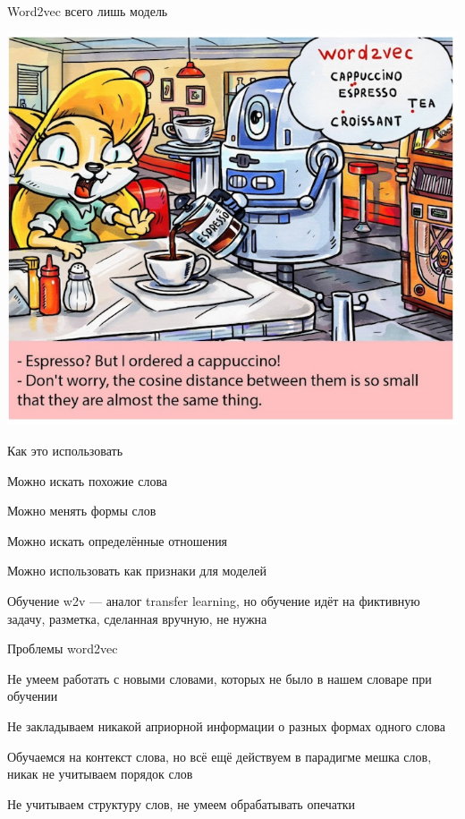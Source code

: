 \documentclass[notes,12pt, aspectratio=169]{beamer}
\newenvironment{wideitemize}{\itemize\addtolength{\itemsep}{10pt}}{\enditemize}
\begin{document}
\begin{frame}{Word2vec всего лишь модель}
	\begin{center}
		\includegraphics[width=.55\linewidth]{w2v_idiot.jpg}
	\end{center}
\end{frame} 


\begin{frame}{Как это использовать}
	\begin{wideitemize} 
		\item Можно искать похожие слова
		
		\item  Можно менять формы слов
		
		\item  Можно искать определённые отношения
		
		\item  Можно использовать как признаки для моделей
		
		\item  Обучение w2v — аналог transfer learning, но обучение идёт на фиктивную задачу, разметка, сделанная вручную, не нужна
	\end{wideitemize} 
\end{frame} 


\begin{frame}{Проблемы word2vec}
	\begin{wideitemize} 
		\item Не умеем работать с новыми словами, которых не было в нашем словаре при обучении
		
		\item  Не закладываем никакой априорной информации о разных
		формах одного слова
		
		\item  Обучаемся на контекст слова, но всё ещё действуем в парадигме мешка слов, никак не учитываем порядок слов
		
		\item Не учитываем структуру слов, не умеем обрабатывать опечатки	
	\end{wideitemize} 
\end{frame} 
\end{document}
